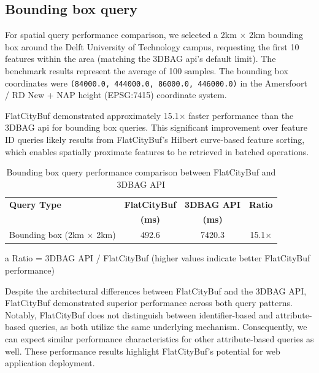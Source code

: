 \subsection{Bounding box query}
\label{result:benchmark_over_the_web:bounding_box_query}

For spatial query performance comparison, we selected a 2km $\times$ 2km bounding box around the Delft University of Technology campus, requesting the first 10 features within the area (matching the 3DBAG \ac{api}'s default limit). The benchmark results represent the average of 100 samples. The bounding box coordinates were \texttt{(84000.0, 444000.0, 86000.0, 446000.0)} in the Amersfoort / RD New + NAP height (EPSG:7415) coordinate system.

FlatCityBuf demonstrated approximately 15.1$\times$ faster performance than the 3DBAG \ac{api} for bounding box queries. This significant improvement over feature ID queries likely results from FlatCityBuf's Hilbert curve-based feature sorting, which enables spatially proximate features to be retrieved in batched operations.

\begin{table}[ht]
  \centering
  \caption{Bounding box query performance comparison between FlatCityBuf and 3DBAG API}
  \label{tab:bounding_box_performance}
  \begin{tabular}{lccc}
    \toprule
    \textbf{Query Type} & \textbf{FlatCityBuf} & \textbf{3DBAG API} & \textbf{Ratio\tnote{a}} \\
    & \textbf{(ms)} & \textbf{(ms)} & \\
    \midrule
    Bounding box (2km $\times$ 2km) & 492.6 & 7420.3 & 15.1$\times$ \\
    \bottomrule
  \end{tabular}
  \begin{tablenotes}[flushleft]
    \footnotesize
  \item[a] Ratio = 3DBAG API / FlatCityBuf (higher values indicate better FlatCityBuf performance)
  \end{tablenotes}
\end{table}

Despite the architectural differences between FlatCityBuf and the 3DBAG API, FlatCityBuf demonstrated superior performance across both query patterns. Notably, FlatCityBuf does not distinguish between identifier-based and attribute-based queries, as both utilize the same underlying mechanism. Consequently, we can expect similar performance characteristics for other attribute-based queries as well. These performance results highlight FlatCityBuf's potential for web application deployment.